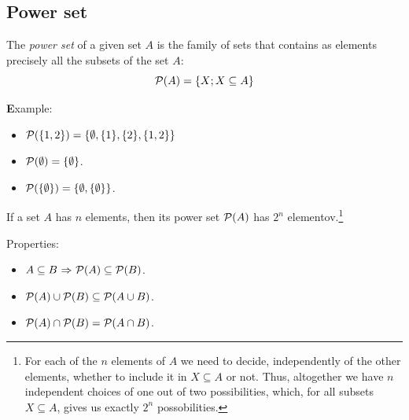 \documentclass[11pt,paper=b5,footinclude,headinclude]{scrbook} %
\def\P {{\cal P}}
\def\sledi {{~\Rightarrow~}}
\def\brez {{\,\setminus\,}}
\theoremstyle{remark}
\theoremstyle{definition} %
\begin{document}



%
%

\subsection{Power set}

The {\em power set} of a given set $A$ is the family of sets that contains as elements
precisely all the subsets of the set $A$:
$${\cal P}(A) = \{X; X\subseteq A\}$$

{\textbf Example:}
\begin{itemize}
  \item ${\cal P}(\{1,2\}) = \{\emptyset, \{1\},\{2\},\{1,2\}\}$
  \item ${\cal P}(\emptyset) = \{\emptyset\}$.
  \item ${\cal P}(\{\emptyset\}) = \{\emptyset, \{\emptyset\}\}$.
\end{itemize}

If a set $A$ has $n$ elements, then its power set ${\cal P}(A)$ has  $2^n$ elementov.\footnote{For each of the $n$ elements of $A$ we need to decide, independently of the other elements, whether to include it in $X\subseteq A$ or not. Thus, altogether we have $n$
independent choices of one out of two possibilities, which, for all subsets $X\subseteq A$, gives us exactly $2^n$ possobilities.}

\bigskip
Properties:
\begin{itemize}
  \item $A\subseteq B\sledi \P(A) \subseteq \P(B)$.
  \item $\P(A) \cup \P(B) \subseteq \P(A\cup B)$.
  \item $\P(A)\cap \P(B) =  \P(A\cap B)$.
\end{itemize}
\end{document}
